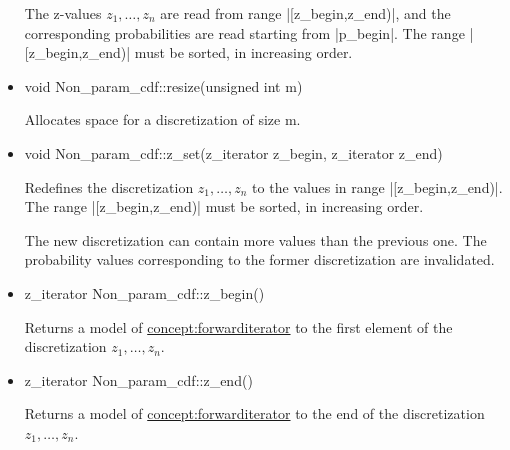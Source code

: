 \documentclass[12pt,twoside]{report}
\begin{document}
\begin{itemize}
The z-values $z_1,\ldots,z_n$ are read from range |[z_begin,z_end)|, and the corresponding probabilities are read starting from |p_begin|. The range |[z_begin,z_end)| must be sorted, in increasing order. 


\item 
\begin{code}
void Non_param_cdf::resize(unsigned int m)
\end{code}


Allocates space for a discretization of size m. 



\item
 \begin{code}
void Non_param_cdf::z_set(z_iterator z_begin, z_iterator z_end)
\end{code}

Redefines the discretization $z_1,\ldots,z_n$ to the values in range |[z_begin,z_end)|. The range |[z_begin,z_end)| must be sorted, in increasing order.

The new discretization can contain more values than the previous one. The probability values corresponding to the former discretization are invalidated.

%
%

\item
 \begin{code}
z_iterator Non_param_cdf::z_begin()
\end{code}

Returns a model of \hyperref{Forward Iterator}{Forward Iterator (see Section}{)}{concept:forwarditerator} to the first element of the discretization $z_1,\ldots,z_n$.

\item
 \begin{code}
z_iterator Non_param_cdf::z_end()
\end{code}

Returns a model of \hyperref{Forward Iterator}{Forward Iterator (see Section}{)}{concept:forwarditerator} to the end of the discretization $z_1,\ldots,z_n$.


\end{itemize}
\end{document}
